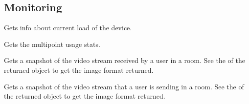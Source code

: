 \subsection{Monitoring}
\begin{Api}

Gets info about current load of the device.

Gets the multipoint usage stats.

Gets a snapshot of the video stream received by a user in a room. See the  of the returned object to get the image format returned.

Gets a snapshot of the video stream that a user is sending in a room. See the  of the returned object to get the image format returned.

\end{Api}


